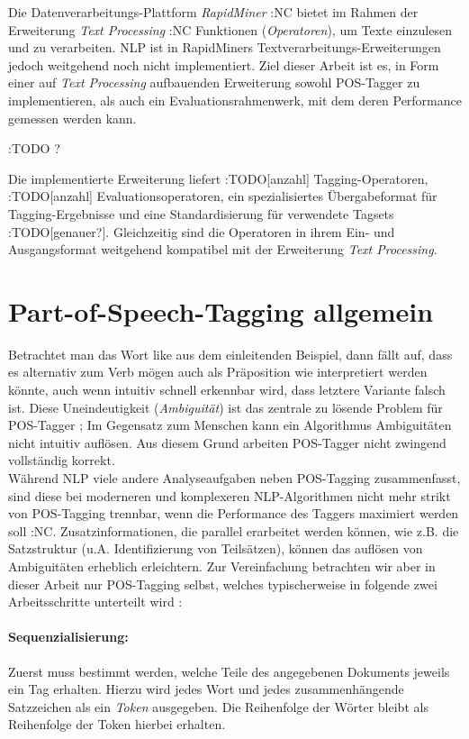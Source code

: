 Die Datenverarbeitungs-Plattform \textit{RapidMiner} :NC bietet im Rahmen der Erweiterung \textit{Text Processing} :NC Funktionen (\textit{Operatoren}), um Texte einzulesen und zu verarbeiten. NLP ist in RapidMiners Textverarbeitungs-Erweiterungen jedoch weitgehend noch nicht implementiert. Ziel dieser Arbeit ist es, in Form einer auf \textit{Text Processing} aufbauenden Erweiterung sowohl POS-Tagger zu implementieren, als auch ein Evaluationsrahmenwerk, mit dem deren Performance gemessen werden kann.

:TODO ?

Die implementierte Erweiterung liefert :TODO[anzahl] Tagging-Operatoren, :TODO[anzahl] Evaluationsoperatoren, ein spezialisiertes Übergabeformat für Tagging-Ergebnisse und eine Standardisierung für verwendete Tagsets :TODO[genauer?]. Gleichzeitig sind die Operatoren in ihrem Ein- und Ausgangsformat weitgehend kompatibel mit der Erweiterung \textit{Text Processing}.

\section{Part-of-Speech-Tagging allgemein}
\label{sec:intro:pos}

Betrachtet man das Wort \glqq like\grqq{} aus dem einleitenden Beispiel, dann fällt auf, dass es alternativ zum Verb \glqq mögen\grqq{} auch als Präposition \glqq wie\grqq{} interpretiert werden könnte, auch wenn intuitiv schnell erkennbar wird, dass letztere Variante falsch ist. Diese Uneindeutigkeit (\textit{Ambiguität}) ist das zentrale zu lösende Problem für POS-Tagger  \cite{Smith:2011}; Im Gegensatz zum Menschen kann ein Algorithmus Ambiguitäten nicht intuitiv auflösen. Aus diesem Grund arbeiten POS-Tagger nicht zwingend vollständig korrekt.
\\
Während NLP viele andere Analyseaufgaben neben POS-Tagging zusammenfasst, sind diese bei moderneren und komplexeren NLP-Algorithmen nicht mehr strikt von POS-Tagging trennbar, wenn die Performance des Taggers maximiert werden soll :NC. Zusatzinformationen, die parallel erarbeitet werden können, wie z.B. die Satzstruktur (u.A. Identifizierung von Teilsätzen), können das auflösen von Ambiguitäten erheblich erleichtern. Zur Vereinfachung betrachten wir aber in dieser Arbeit nur POS-Tagging selbst, welches typischerweise in folgende zwei Arbeitsschritte unterteilt wird \cite{Smith:2011}:

\paragraph{Sequenzialisierung:} Zuerst muss bestimmt werden, welche Teile des angegebenen Dokuments jeweils ein Tag erhalten. Hierzu wird jedes Wort und jedes zusammenhängende Satzzeichen als ein \textit{Token} ausgegeben. Die Reihenfolge der Wörter bleibt als Reihenfolge der Token hierbei erhalten. 
